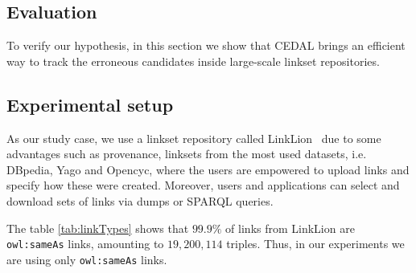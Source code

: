 
\subsection{Evaluation} \label{ev:cedal}

To verify our hypothesis, in this section we show that CEDAL brings an efficient way to track the erroneous candidates inside large-scale linkset repositories. 

\subsection{Experimental setup}
As our study case, we use a linkset repository called LinkLion~\cite{nentwig2014linklion} due to some advantages such as provenance, linksets from the most used datasets, i.e. DBpedia, Yago and Opencyc, where the users are empowered to upload links and specify how these were created. Moreover, users and applications can select and download sets of links via dumps or SPARQL queries. 

The table \ref{tab:linkTypes} shows that $99.9 \%$ of links from LinkLion are \texttt{owl:sameAs} links, amounting to $19,200,114$ triples. Thus, in our experiments we are using only \texttt{owl:sameAs} links. 

